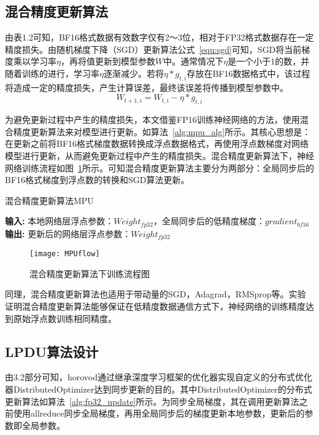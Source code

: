 \subsection{混合精度更新算法}
由表1.2可知，BF16格式数据有效数字仅有2～3位，相对于FP32格式数据存在一定精度损失。由随机梯度下降（SGD）更新算法公式~\ref{equ:sgd}可知，SGD将当前梯度乘以学习率$\eta$，再将值更新到模型参数$W$中。通常情况下$\eta$是一个小于1的数，并随着训练的进行，学习率$\eta$逐渐减少。若将$\eta*g_{t,i}$存放在BF16数据格式中，该过程将造成一定的精度损失，产生计算误差，最终该误差将传播到模型参数中。
\begin{equation}
\label{equ:sgd}
W_{t+1,i}=W_{t,i}-\eta*g_{t,i}
\end{equation}

为避免更新过程中产生的精度损失，本文借鉴FP16训练神经网络的方法，使用混合精度更新算法来对模型进行更新。如算法~\ref{alg:mpu_alg}所示。其核心思想是：在更新之前将BF16格式梯度数据转换成浮点数据格式，再使用浮点数梯度对网络模型进行更新，从而避免更新过程中产生的精度损失。混合精度更新算法下，神经网络训练流程如图~\ref{fig:MPUflow}所示。可知混合精度更新算法主要分为两部分：全局同步后的BF16格式梯度到浮点数的转换和SGD算法更新。

\begin{algorithm}\small
\caption{混合精度更新算法MPU}
\textbf{输入:}
本地网络层浮点参数：$Weight_{fp32}$，全局同步后的低精度梯度：$gradient_{bf16}$ \\
\textbf{输出:} 
更新后的网络层浮点参数：$Weight_{fp32}$
\begin{algorithmic}[1]
\end{algorithmic}
	\label{alg:mpu_alg}
\end{algorithm}

\begin{figure}[htp]
\centering
\texttt{[image: MPUflow]}
\caption{混合精度更新算法下训练流程图}
\label{fig:MPUflow}
\end{figure}


同理，混合精度更新算法也适用于带动量的SGD，Adagrad，RMSprop等。实验证明混合精度更新算法能够保证在低精度数据通信方式下，神经网络的训练精度达到原始浮点数训练相同精度。

\subsection{LPDU算法设计}
由3.2部分可知，horovod通过继承深度学习框架的优化器实现自定义的分布式优化器DistributedOptimizer达到同步更新的目的。其中DistributedOptimizer的分布式更新算法如算法~\ref{alg:fp32_update}所示。为同步全局梯度，其在调用更新算法之前使用allreduce同步全局梯度，再用全局同步后的梯度更新本地参数，更新后的参数即全局参数。


